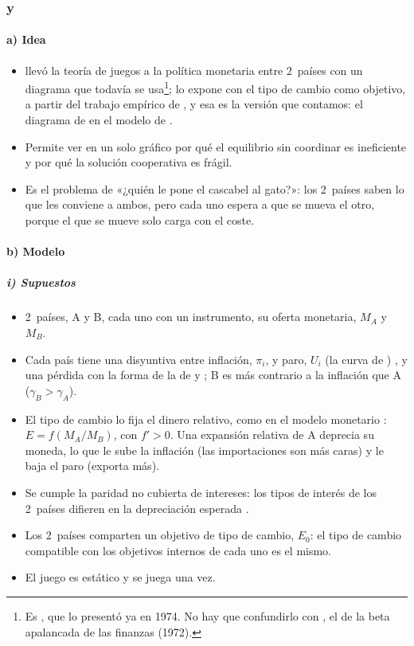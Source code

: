 \documentclass[11pt]{article}
\begin{document}
\subsubsection{ y }\label{sec:hamada}

\paragraph{a) Idea}
\begin{itemize}
\item \textcite{Hamada1976Strategic} llevó la teoría de juegos a la política monetaria entre 2~países con un diagrama que todavía se usa\footnote{Es , que lo presentó ya en 1974\nocite{Hamada1974Alternative}. No hay que confundirlo con , el de la beta apalancada de las finanzas (1972).}; \textcite{Corden1994Economic} lo expone con el tipo de cambio como objetivo, a partir del trabajo empírico de \textcite{OudizSachs1984}, y esa es la versión que contamos: el diagrama de  en el modelo de .
\item Permite ver en un solo gráfico por qué el equilibrio sin coordinar es ineficiente y por qué la solución cooperativa es frágil.
\item Es el problema de «¿quién le pone el cascabel al gato?»: los 2~países saben lo que les conviene a ambos, pero cada uno espera a que se mueva el otro, porque el que se mueve solo carga con el coste.
\end{itemize}

\paragraph{b) Modelo}
\subparagraph{i) Supuestos}
\begin{itemize}
\item 2~países, A y B, cada uno con un instrumento, su oferta monetaria, $M_A$ y $M_B$.
\item Cada país tiene una disyuntiva entre inflación, $\pi_i$, y paro, $U_i$ (la curva de ) , y una pérdida con la forma de la de  y  ; B es más contrario a la inflación que A ($\gamma_B>\gamma_A$).
\item El tipo de cambio lo fija el dinero relativo, como en el modelo monetario : $E=f(M_A/M_B)$, con $f'>0$. Una expansión relativa de A deprecia su moneda, lo que le sube la inflación (las importaciones son más caras) y le baja el paro (exporta más).
\item Se cumple la paridad no cubierta de intereses: los tipos de interés de los 2~países difieren en la depreciación esperada .
\item Los 2~países comparten un objetivo de tipo de cambio, $E_0$: el tipo de cambio compatible con los objetivos internos de cada uno es el mismo.
\item El juego es estático y se juega una vez.
\end{itemize}
\end{document}
